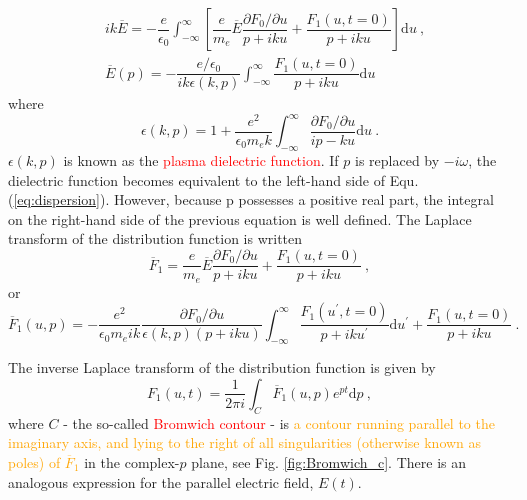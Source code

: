 \documentclass[12pt,a4paper]{article}
\newcommand{\dif}{\mathrm{d}}
\begin{document}
\begin{align}
& ik\overline{E} = -\dfrac{e}{\epsilon_0} \int_{-\infty}^\infty \left[\dfrac{e}{m_e} \overline{E} \dfrac{\partial F_0/\partial u}{p+iku} +\dfrac{F_1(u,t=0)}{p+iku} \right] \dif u ~, \\
& \overline{E}(p) = -\dfrac{e/\epsilon_0}{ik\epsilon(k,p)} \int_{-\infty}^\infty \dfrac{F_1(u,t=0)}{p+iku}  \dif u
\end{align}
where
\begin{equation}
\epsilon(k,p) = 1+ \dfrac{e^2}{\epsilon_0 m_e k} \int_{-\infty}^\infty \dfrac{\partial F_0/\partial u}{ip -ku} \dif u ~.
\end{equation}
$\epsilon(k,p)$ is known as the \textcolor{red}{plasma dielectric function}. If $p$ is replaced by $-i \omega$, the dielectric function becomes equivalent to the left-hand side of Equ. (\ref{eq:dispersion}). However, because p possesses a positive real part, the integral on the right-hand side of the previous equation is well defined. The Laplace transform of the distribution function is written
\begin{equation}
\overline{F}_1 = \dfrac{e}{m_e} \overline{E} \dfrac{\partial F_0/\partial u}{p +iku} + \dfrac{F_1(u,t=0)}{p+iku} ~,
\end{equation}
or 
\begin{equation}
\overline{F}_1(u,p) = -\dfrac{e^2}{\epsilon_0 m_e ik} \dfrac{\partial F_0/\partial u}{\epsilon(k,p)(p +iku)} \int_{-\infty}^\infty  \dfrac{F_1(u^\prime,t=0)}{p+iku^\prime} \dif u^\prime + \dfrac{F_1(u,t=0)}{p+iku} ~.
\end{equation}

The inverse Laplace transform of the distribution function is given by
\begin{equation}
F_1(u,t) = \dfrac{1}{2\pi i} \int_C \overline{F}_1 (u,p) e^{pt} \dif p ~,
\end{equation}
where $C$ - the so-called \textcolor{red}{Bromwich contour} - is \textcolor{orange}{a contour running parallel to the imaginary axis, and lying to the right of all singularities (otherwise known as poles) of $\overline{F}_1$} in the complex-$p$ plane, see Fig. \ref{fig:Bromwich_c}. There is an analogous expression for the parallel electric field, $E(t)$.
\end{document}
